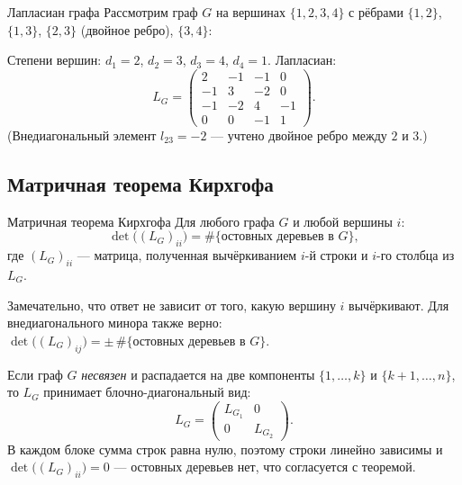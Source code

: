 \begin{Example}{Лапласиан графа}{}
	Рассмотрим граф $G$ на вершинах $\{1,2,3,4\}$ с рёбрами
	$\{1,2\}$, $\{1,3\}$, $\{2,3\}$ (двойное ребро), $\{3,4\}$:

	\begin{center}
	\end{center}

	Степени вершин: $d_1=2$, $d_2=3$, $d_3=4$, $d_4=1$. Лапласиан:
	\[
	L_G =
	\begin{pmatrix}
		2 & -1 & -1 &  0 \\
		-1 &  3 & -2 &  0 \\
		-1 & -2 &  4 & -1 \\
		0 &  0 & -1 &  1
	\end{pmatrix}.
	\]
	(Внедиагональный элемент $l_{23}=-2$ — учтено двойное ребро между $2$ и $3$.)
\end{Example}

\subsection{Матричная теорема Кирхгофа}

\begin{Theorem}{Матричная теорема Кирхгофа}{}
	Для любого графа $G$ и любой вершины $i$:
	\[
	\det\!\bigl((L_G)_{ii}\bigr) = \#\{\text{остовных деревьев в } G\},
	\]
	где $(L_G)_{ii}$ — матрица, полученная вычёркиванием $i$-й строки и $i$-го столбца из $L_G$.
\end{Theorem}

\begin{Remark}{}{}
	Замечательно, что ответ не зависит от того, какую вершину $i$ вычёркивают. Для внедиагонального минора также верно:
	$\det\!\bigl((L_G)_{ij}\bigr) = \pm\,\#\{\text{остовных деревьев в } G\}$.
\end{Remark}

\begin{Remark}{}{}
	Если граф $G$ \emph{несвязен} и распадается на две компоненты
	$\{1,\ldots,k\}$ и $\{k{+}1,\ldots,n\}$, то $L_G$ принимает блочно-диагональный вид:
	\[
	L_G =
	\begin{pmatrix}
		L_{G_1} & 0 \\
		0       & L_{G_2}
	\end{pmatrix}.
	\]
	В каждом блоке сумма строк равна нулю, поэтому строки линейно зависимы и
	$\det\!\bigl((L_G)_{ii}\bigr) = 0$ — остовных деревьев нет, что согласуется с теоремой.
\end{Remark}

